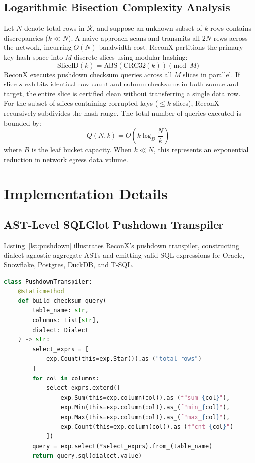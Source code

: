 \documentclass[10pt,journal,compsoc]{IEEEtran}
\begin{document}
\subsection{Logarithmic Bisection Complexity Analysis}
Let $N$ denote total rows in $\mathcal{R}$, and suppose an unknown subset of $k$ rows contains discrepancies ($k \ll N$). 
A naive approach scans and transmits all $2N$ rows across the network, incurring $O(N)$ bandwidth cost.
ReconX partitions the primary key hash space into $M$ discrete slices using modular hashing:
\begin{equation}
\text{SliceID}(k) = \text{ABS}(\text{CRC32}(k)) \pmod M
\end{equation}
ReconX executes pushdown checksum queries across all $M$ slices in parallel. If slice $s$ exhibits identical row count and column checksums in both source and target, the entire slice is certified clean without transferring a single data row.
For the subset of slices containing corrupted keys ($\le k$ slices), ReconX recursively subdivides the hash range.
The total number of queries executed is bounded by:
\begin{equation}
Q(N, k) = O\left(k \log_B \frac{N}{k}\right)
\end{equation}
where $B$ is the leaf bucket capacity. When $k \ll N$, this represents an exponential reduction in network egress data volume.

\section{Implementation Details}
\subsection{AST-Level SQLGlot Pushdown Transpiler}
Listing~\ref{lst:pushdown} illustrates ReconX's pushdown transpiler, constructing dialect-agnostic aggregate ASTs and emitting valid SQL expressions for Oracle, Snowflake, Postgres, DuckDB, and T-SQL.

\begin{lstlisting}[language=Python, caption={SQLGlot AST Pushdown Transpiler.}, label={lst:pushdown}]
class PushdownTranspiler:
    @staticmethod
    def build_checksum_query(
        table_name: str, 
        columns: List[str], 
        dialect: Dialect
    ) -> str:
        select_exprs = [
            exp.Count(this=exp.Star()).as_("total_rows")
        ]
        for col in columns:
            select_exprs.extend([
                exp.Sum(this=exp.column(col)).as_(f"sum_{col}"),
                exp.Min(this=exp.column(col)).as_(f"min_{col}"),
                exp.Max(this=exp.column(col)).as_(f"max_{col}"),
                exp.Count(this=exp.column(col)).as_(f"cnt_{col}")
            ])
        query = exp.select(*select_exprs).from_(table_name)
        return query.sql(dialect.value)
\end{lstlisting}
\end{document}
